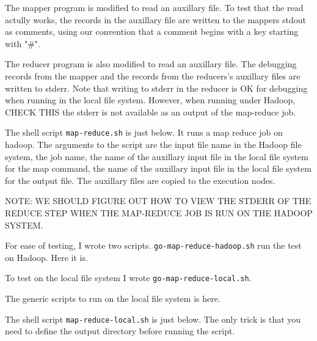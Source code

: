 \documentclass{article}
\let\code\texttt %
\begin{document}
The mapper program is modified to read an auxillary file. To test that
the read actully works, the records in the auxillary file are written
to the mappers stdout as comments, using our convention that a comment
begins with a key starting with "\#".



The reducer program is also modified to read an auxillary file. The
debugging records from the mapper and the records from the reducers's
auxillary files are written to stderr. Note that writing to stderr in
the reducer is OK for debugging when running in the local file system.
However, when running under Hadoop, CHECK THIS the stderr is not
available as an output of the map-reduce job.



The shell script \code{map-reduce.sh} is
just below. It runs a map reduce job on hadoop. The arguments to the
script are the input file name in the Hadoop file system, the job name,
the name of the auxillary input file in the local file system for the
map command, the name of the auxillary input file in the local file
system for the output file. The auxillary files are copied to the
execution nodes.

NOTE: WE SHOULD FIGURE OUT HOW TO VIEW THE STDERR OF THE REDUCE STEP
WHEN THE MAP-REDUCE JOB IS RUN ON THE HADOOP SYSTEM.



For ease of testing, I wrote two scripts. \code{go-map-reduce-hadoop.sh}
run the test on Hadoop. Here it is.



To test on the local file system I wrote \code{go-map-reduce-local.sh}.



The generic scripts to run on the local file system is here.



The shell script \code{map-reduce-local.sh} is just below. The only
trick is that you need to define the output directory before running the
script.


\end{document}
